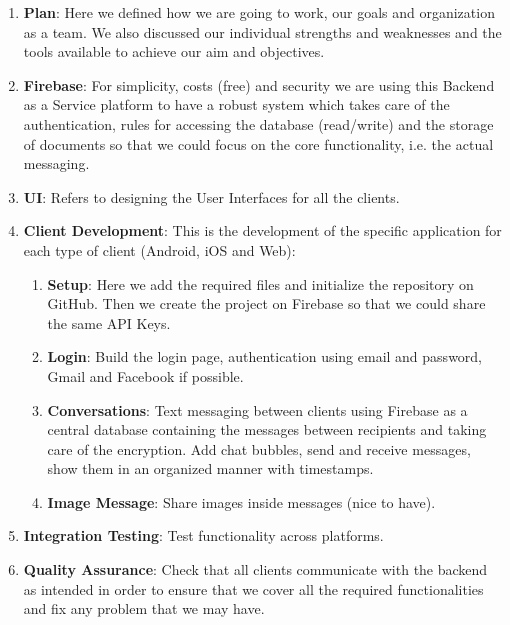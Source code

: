 \begin{enumerate}
	\item \textbf{Plan}: Here we defined how we are going to work, our goals and organization as a team. We also discussed our individual strengths and weaknesses and the tools available to achieve our aim and objectives.
	\item \textbf{Firebase}: For simplicity, costs (free) and security we are using this Backend as a Service platform to have a robust system which takes care of the authentication, rules for accessing the database (read/write) and the storage of documents so that we could focus on the core functionality, i.e. the actual messaging.
	\item \textbf{UI}: Refers to designing the User Interfaces for all the clients.
	\item \textbf{Client Development}: This is the development of the specific application for each type of client (Android, iOS and Web): 
	\begin{enumerate}
		\item \textbf{Setup}: Here we add the required files and initialize the repository on GitHub. Then we create the project on Firebase so that we could share the same API Keys.
		\item \textbf{Login}: Build the login page, authentication using email and password, Gmail and Facebook if possible.
		\item \textbf{Conversations}: Text messaging between clients using Firebase as a central database containing the messages between recipients and taking care of the encryption. Add chat bubbles, send and receive messages, show them in an organized manner with timestamps.  
		\item \textbf{Image Message}: Share images inside messages (nice to have).
	\end{enumerate}
		\item \textbf{Integration Testing}: Test functionality across platforms. 
		\item \textbf{Quality Assurance}: Check that all clients communicate with the backend as intended in order to ensure that we cover all the required functionalities and fix any problem that we may have.	
\end{enumerate}

